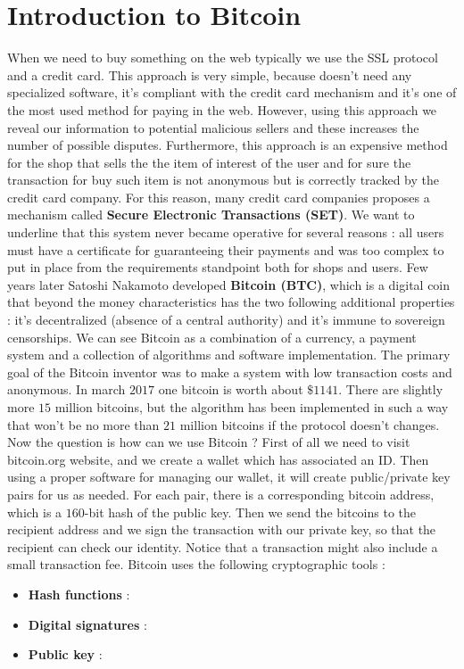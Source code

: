 \section{Introduction to Bitcoin}
When we need to buy something on the web typically we use the SSL protocol and a credit card. This approach is very simple, because doesn't need any specialized software, it's compliant with the credit card mechanism and it's one of the most used method for paying in the web. However, using this approach we reveal our information to potential malicious sellers and these increases the number of possible disputes. Furthermore, this approach is an expensive method for the shop that sells the the item of interest of the user and for sure the transaction for buy such item is not anonymous but is correctly tracked by the credit card company. For this reason, many credit card companies proposes a mechanism called \textbf{Secure Electronic Transactions (SET)}. We want to underline that this system never became operative for several reasons : all users must have a certificate for guaranteeing their payments and was too complex to put in place from the requirements standpoint both for shops and users. Few years later Satoshi Nakamoto developed \textbf{Bitcoin (BTC)}, which is a digital coin that beyond the money characteristics has the two following additional properties : it's decentralized (absence of a central authority) and it's immune to sovereign censorships. We can see Bitcoin as a combination of a currency, a payment system and a collection of algorithms and software implementation. The primary goal of the Bitcoin inventor was to make a system with low transaction costs and anonymous. In march $2017$ one bitcoin is worth about $\$ 1141$. There are slightly more $15$ million bitcoins, but the algorithm has been implemented in such a way that won't be no more than $21$ million bitcoins if the protocol doesn't changes. Now the question is how can we use Bitcoin ? First of all we need to visit bitcoin.org website, and we create a wallet which has associated an ID. Then using a proper software for managing our wallet, it will create public/private key pairs for us as needed. For each pair, there is a corresponding bitcoin address, which is a $160$-bit hash of the public key. Then we send the bitcoins to the recipient address and we sign the transaction with our private key, so that the recipient can check our identity. Notice that a transaction might also include a small transaction fee. Bitcoin uses the following cryptographic tools :
\begin{itemize}
\item \textbf{Hash functions} :
\item \textbf{Digital signatures} :
\item \textbf{Public key} : 
\end{itemize}
